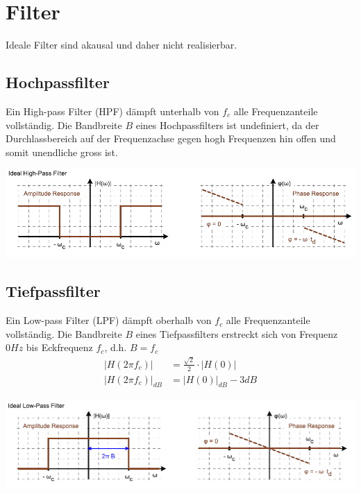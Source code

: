 \section{Filter}
Ideale Filter sind akausal und daher nicht realisierbar.

\subsection{Hochpassfilter}
Ein High-pass Filter (HPF) dämpft unterhalb von $f_c$ alle Frequenzanteile vollständig. Die Bandbreite $B$ eines Hochpassfilters ist undefiniert, da der Durchlassbereich auf der Frequenzachse gegen hogh Frequenzen hin offen und somit unendliche gross ist.
\begin{center}
	\includegraphics[width=0.8\columnwidth]{Images/hochpass}
\end{center}


\subsection{Tiefpassfilter}
Ein Low-pass Filter (LPF) dämpft oberhalb von $f_c$ alle Frequenzanteile vollständig. Die Bandbreite $B$ eines Tiefpassfilters erstreckt sich von Frequenz $0Hz$ bis Eckfrequenz $f_c$, d.h. $B = f_c$
\begin{align*}
	\left|H(2\pi f_{c})\right| &= \frac{\sqrt{2}}{2}\cdot \left|H(0)\right| \\
	\left|H(2\pi f_{c})\right|_{dB} &= \left|H(0)\right|_{dB} - 3dB
\end{align*}

\begin{center}
	\includegraphics[width=0.8\columnwidth]{Images/tiefpass}
\end{center}

